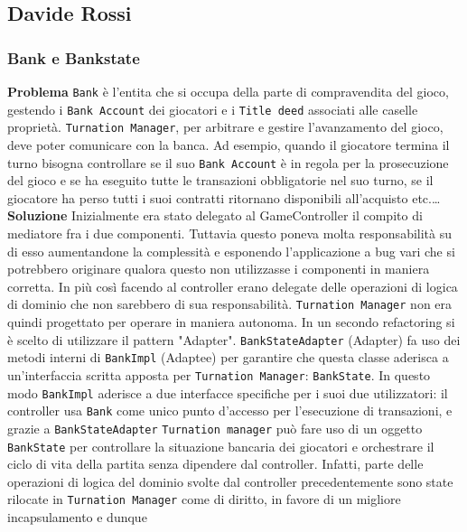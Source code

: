 \subsection{Davide Rossi}
\subsubsection{Bank e Bankstate}
\textbf{Problema}\newline
\texttt{Bank} è l'entita che si occupa della parte di compravendita del gioco, gestendo i \texttt{Bank Account} dei giocatori 
e i \texttt{Title deed} associati alle caselle proprietà.
\texttt{Turnation Manager}, per arbitrare e gestire l'avanzamento del gioco, deve poter comunicare con la banca. Ad esempio, quando il giocatore termina il turno bisogna
controllare se il suo \texttt{Bank Account} è in regola per la prosecuzione del gioco e se ha eseguito tutte le transazioni
obbligatorie nel suo turno, se il giocatore ha perso tutti i suoi contratti ritornano disponibili all'acquisto etc.\dots\newline
\textbf{Soluzione}\newline
Inizialmente era stato delegato al GameController il compito di mediatore fra i due componenti. 
Tuttavia questo poneva molta responsabilità su di esso aumentandone la complessità e esponendo l'applicazione a bug vari
che si potrebbero originare qualora questo non utilizzasse i componenti in maniera corretta. 
In più così facendo al controller erano delegate delle operazioni di logica di dominio che non sarebbero di sua responsabilità.\newline
\texttt{Turnation Manager} non era quindi progettato per operare in maniera autonoma. \newline
In un secondo refactoring si è scelto di utilizzare il pattern "Adapter".\newline
\texttt{BankStateAdapter} (Adapter) fa uso dei metodi interni di \texttt{BankImpl} (Adaptee) per garantire che questa classe aderisca 
a un'interfaccia scritta apposta per \texttt{Turnation Manager}: \texttt{BankState}.
In questo modo \texttt{BankImpl} aderisce a due interfacce
specifiche per i suoi due utilizzatori: il controller usa \texttt{Bank} come unico punto d'accesso per l'esecuzione di transazioni, e grazie a \texttt{BankStateAdapter} \texttt{Turnation manager} può fare uso di 
un oggetto \texttt{BankState} per controllare la situazione bancaria dei giocatori e orchestrare il ciclo di vita della partita senza dipendere dal controller.
Infatti, parte delle operazioni di logica del dominio svolte dal controller precedentemente sono state rilocate in \texttt{Turnation Manager} come di diritto, in favore di un migliore incapsulamento e dunque
